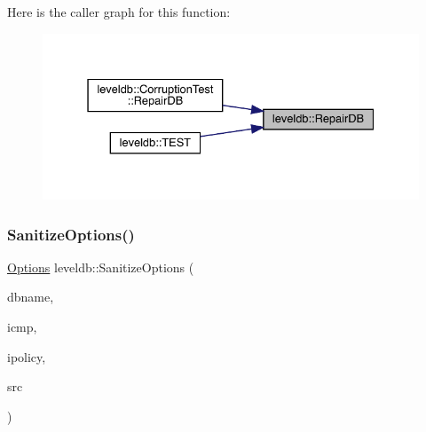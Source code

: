Here is the caller graph for this function\+:
\nopagebreak
\begin{figure}[H]
\begin{center}
\leavevmode
\includegraphics[width=331pt]{namespaceleveldb_aa19b8fd0c5732d463fbf6af09792676a_icgraph}
\end{center}
\end{figure}
\mbox{\label{namespaceleveldb_aa4783e598841dca4393a97d360d10f56}} 
\subsubsection{\texorpdfstring{SanitizeOptions()}{SanitizeOptions()}}
{\footnotesize\ttfamily \mbox{\hyperlink{structleveldb_1_1_options}{Options}} leveldb\+::\+Sanitize\+Options (\begin{DoxyParamCaption}\item[{const std\+::string \&}]{dbname,  }\item[{const \mbox{\hyperlink{classleveldb_1_1_internal_key_comparator}{Internal\+Key\+Comparator}} $\ast$}]{icmp,  }\item[{const \mbox{\hyperlink{classleveldb_1_1_internal_filter_policy}{Internal\+Filter\+Policy}} $\ast$}]{ipolicy,  }\item[{const \mbox{\hyperlink{structleveldb_1_1_options}{Options}} \&}]{src }\end{DoxyParamCaption})}

